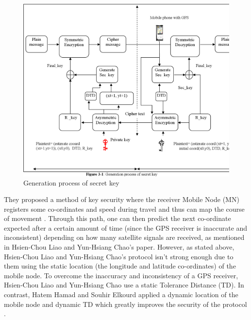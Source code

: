 \documentclass[journal]{IEEEtran}
\begin{document}
\newline
\begin{figure}[!h]
    \centering
    \includegraphics[scale=.1]{37-Figure3-1-1}
    \caption{Generation process of secret key}
    \label{fig:gpsk}
\end{figure}

They proposed a method of key security where the receiver Mobile Node (MN) registers some co-ordinates and speed during travel and thus can map the course of movement \cite{encryption_mobile_node}. Through this path, one can then predict the next co-ordinate expected after a certain amount of time (since the GPS receiver is inaccurate and inconsistent) depending on how many satellite signals are received, as mentioned in Hsien-Chou Liao and Yun-Hsiang Chao's paper. However, as stated above, Hsien-Chou Liao and Yun-Hsiang Chao's protocol isn't strong enough due to them using the static location (the longitude and latitude co-ordinates) of the mobile node. To overcome the inaccuracy and inconsistency of a GPS receiver, Hsien-Chou Liao and Yun-Hsiang Chao use a static Tolerance Distance (TD). In contrast, Hatem Hamad and Souhir Elkourd applied a dynamic location of the mobile node and dynamic TD which greatly improves the security of the protocol \cite{encryption_mobile_node}.
\end{document}
